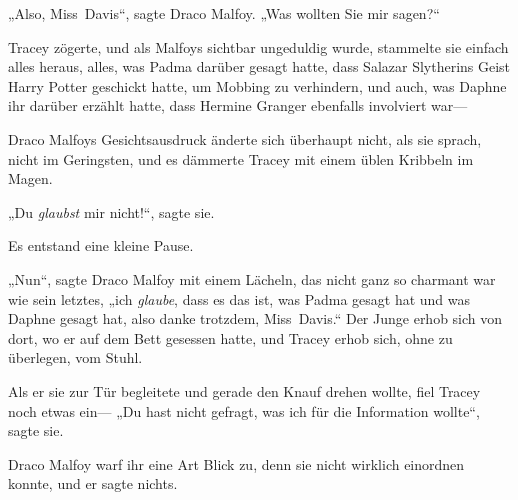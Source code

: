 „Also, Miss~Davis“, sagte Draco Malfoy. „Was wollten Sie mir sagen?“

Tracey zögerte, und als Malfoys sichtbar ungeduldig wurde, stammelte sie einfach alles heraus, alles, was Padma darüber gesagt hatte, dass Salazar Slytherins Geist Harry Potter geschickt hatte, um Mobbing zu verhindern, und auch, was Daphne ihr darüber erzählt hatte, dass Hermine Granger ebenfalls involviert war—

Draco Malfoys Gesichtsausdruck änderte sich überhaupt nicht, als sie sprach, nicht im Geringsten, und es dämmerte Tracey mit einem üblen Kribbeln im Magen.

„Du \emph{glaubst} mir nicht!“, sagte sie.

Es entstand eine kleine Pause.

„Nun“, sagte Draco Malfoy mit einem Lächeln, das nicht ganz so charmant war wie sein letztes, „ich \emph{glaube}, dass es das ist, was Padma gesagt hat und was Daphne gesagt hat, also danke trotzdem, Miss~Davis.“ Der Junge erhob sich von dort, wo er auf dem Bett gesessen hatte, und Tracey erhob sich, ohne zu überlegen, vom Stuhl.

Als er sie zur Tür begleitete und gerade den Knauf drehen wollte, fiel Tracey noch etwas ein— „Du hast nicht gefragt, was ich für die Information wollte“, sagte sie.

Draco Malfoy warf ihr eine Art Blick zu, denn sie nicht wirklich einordnen konnte, und er sagte nichts.

